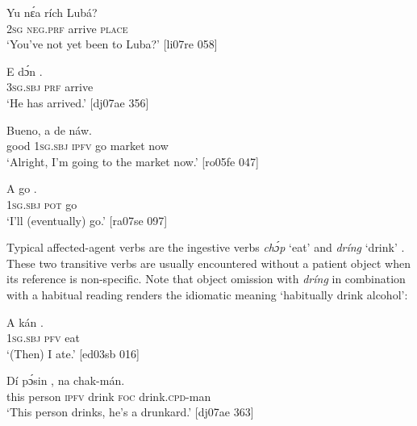 \ea%
    \label{ex:key:1284}
    \gll Yu  nɛ́a    rích    Lubá?\\
\textsc{2sg}  \textsc{neg}.\textsc{prf}  arrive  \textsc{place}\\

\glt ‘You’ve not yet been to Luba?’ [li07re 058]
\z


\ea%
    \label{ex:key:1285}
    \gll E    dɔ́n    .\\
\textsc{3sg.sbj}  \textsc{prf}    arrive\\

\glt ‘He has arrived.’ [dj07ae 356]
\z


\ea%
    \label{ex:key:1286}
    \gll Bueno,  a    de      náw.\\
good  \textsc{1sg.sbj}  \textsc{ipfv}  go  market  now\\

\glt ‘Alright, I’m going to the market now.’ [ro05fe 047]
\z


\ea%
    \label{ex:key:1287}
    \gll A    go  .\\
\textsc{1sg.sbj}  \textsc{pot}  go\\

\glt ‘I’ll (eventually) go.’ [ra07se 097]
\z

Typical affected-agent verbs are the ingestive verbs \textit{chɔ́p}  ‘eat’ and \textit{dríng} ‘drink’ . These two transitive verbs are usually encountered without a patient object when its reference is non-specific. Note that object omission with \textit{dríng} in combination with a habitual reading renders the idiomatic meaning ‘habitually drink alcohol’:


\ea%
    \label{ex:key:1288}
    \gll A    kán  .\\
\textsc{1sg.sbj}  \textsc{pfv}  eat\\

\glt ‘(Then) I ate.’ [ed03sb 016]
\z


\ea%
    \label{ex:key:1289}
    \gll Dí  pɔ́sin    ,  na  chak-mán.\\
this  person  \textsc{ipfv}  drink  \textsc{foc}  drink\textsc{.cpd}{}-man\\

\glt ‘This person drinks, he’s a drunkard.’ [dj07ae 363]
\z

